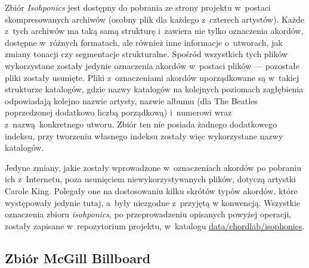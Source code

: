 Zbiór \emph{Isohponics} jest dostępny do pobrania ze strony projektu w~postaci skompresowanych archiwów  (osobny plik dla każdego z~czterech artystów). Każde z~tych archiwów ma taką samą strukturę i~zawiera nie tylko oznaczenia akordów, dostępne w~różnych formatach, ale również inne informacje o~utworach, jak zmiany tonacji czy segmentacje strukturalne. Spośród wszystkich tych plików wykorzystane zostały jedynie oznaczenia akordów w~postaci plików  --- pozostałe pliki zostały usunięte. Pliki z~oznaczeniami akordów uporządkowane są w~takiej strukturze katalogów, gdzie nazwy katalogów na kolejnych poziomach zagłębienia odpowiadają kolejno nazwie artysty, nazwie albumu (dla The Beatles poprzedzonej dodatkowo liczbą porządkową) i~numerowi wraz z~nazwą konkretnego utworu. Zbiór ten nie posiada żadnego dodatkowego indeksu, przy tworzeniu własnego indeksu zostały więc wykorzystane nazwy katalogów.

Jedyne zmiany, jakie zostały wprowadzone w~oznaczeniach akordów po pobraniu ich z~Internetu, poza usunięciem niewykorzystywanych plików, dotyczą artystki Carole King. Polegały one na dostosowaniu kilku skrótów typów akordów, które występowały jedynie tutaj, a~były niezgodne z~przyjętą w \cite{harte_towards_nodate} konwencją. Wszystkie oznaczenia zbioru \emph{isohponics}, po przeprowadzeniu opisanych powyżej operacji, zostały zapisane w~repozytorium projektu, w~katalogu \url{data/chordlab/isophonics}.


\subsection{Zbiór McGill Billboard}


